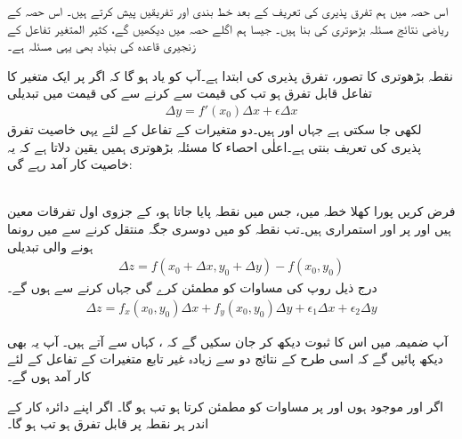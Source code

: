اس حصہ میں ہم تفرق پذیری کی تعریف    کے بعد  خط بندی اور تفریقیں  پیش کرتے ہیں۔ اس حصہ کے  ریاضی نتائج مسئلہ  بڑھوتری کی بنا ہیں۔ جیسا ہم اگلے حصہ میں دیکھیں گے، کثیر المتغیر تفاعل کے  زنجیری قاعدہ  کی بنیاد بھی یہی مسئلہ ہے۔

 نقطہ  بڑھوتری کا تصور،   تفرق پذیری کی   ابتدا ہے۔آپ کو یاد ہو گا کہ اگر  پر ایک متغیر کا تفاعل  قابل تفرق ہو  تب  کی قیمت  سے    کرنے سے  کی قیمت میں تبدیلی 
\begin{align}
\Delta y=f'(x_0)\Delta x+\epsilon \Delta x
\end{align}
لکھی جا سکتی ہے جہاں  اور  ہیں۔دو متغیرات کے تفاعل  کے لئے   یہی خاصیت تفرق پذیری کی تعریف  بنتی ہے۔اعلٰی  احصاء کا   مسئلہ بڑھوتری ہمیں یقین دلاتا ہے کہ یہ خاصیت  کار آمد رہے گی:

\\
فرض کریں    پورا کھلا  خطہ  میں، جس میں نقطہ  پایا جاتا ہو،      کے    جزوی  اول تفرقات  معین  ہیں اور  پر  اور  استمراری ہیں۔تب نقطہ  کو  میں    دوسری جگہ   منتقل کرنے سے  میں رونما ہونے والی تبدیلی
\begin{align*}
\Delta z=f(x_0+\Delta x,y_0+\Delta y)-f(x_0,y_0)
\end{align*}
 درج ذیل روپ  کی مساوات کو مطمئن کرے گی جہاں   کرنے سے  ہوں  گے۔
\begin{align}\label{مساوات_کثیرالمتغیر_تفریق_تعریف_الف}
\Delta z=f_x(x_0,y_0)\Delta x+f_y(x_0,y_0)\Delta y+\epsilon_1\Delta x+\epsilon_2\Delta y
\end{align}

آپ ضمیمہ  میں  اس کا ثبوت  دیکھ کر جان سکیں گے کہ ،  کہاں سے آتے ہیں۔  آپ یہ بھی دیکھ پائیں گے کہ اسی طرح کے نتائج دو سے زیادہ  غیر تابع متغیرات کے تفاعل کے لئے کار آمد ہوں گے۔

اگر    اور   موجود ہوں اور  پر  مساوات   کو مطمئن کرتا ہو تب   ہو گا۔  اگر  اپنے دائرہ کار کے اندر ہر نقطہ پر قابل تفرق ہو تب  ہو گا۔

